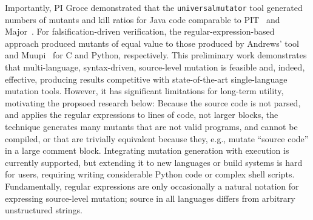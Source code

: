 Importantly,  PI Groce demonstrated that the {\tt universalmutator} tool generated
numbers of mutants and kill ratios for Java code comparable to
PIT~\cite{pittest} and Major~\cite{Major}.  For falsification-driven
verification, the regular-expression-based approach produced mutants of equal
value to those produced by Andrews' tool~\cite{mutant} and Muupi~\cite{muupi}
for C and Python, respectively.
%
%
%
This preliminary work demonstrates that multi-language, syntax-driven, source-level mutation is
feasible and, indeed, effective, producing results competitive with
state-of-the-art single-language mutation tools.
However, it has significant limitations for long-term utility, motivating the
propsoed research below: Because the source
code is not parsed, and applies the regular expressions to lines of code, not
larger blocks, the technique generates many mutants that are not valid programs,
and cannot be compiled, or that are trivially equivalent because they, e.g.,
mutate ``source code'' in a large comment block.  Integrating mutation
generation with execution is currently supported, but extending it to new
languages or build systems is hard for users, requiring writing considerable
Python code or complex shell scripts.
Fundamentally, regular expressions are
only occasionally a natural notation for expressing source-level mutation;
source in all languages differs from arbitrary unstructured strings.

